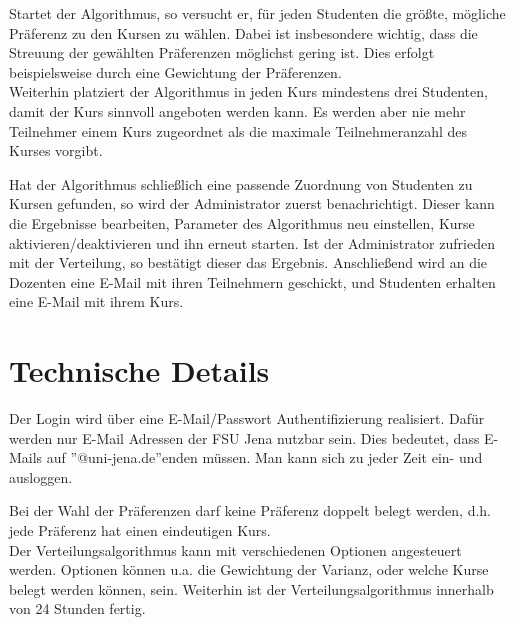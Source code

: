         Startet der Algorithmus, so versucht er, für jeden Studenten die größte, mögliche Präferenz zu den Kursen zu wählen.
        Dabei ist insbesondere wichtig, dass die Streuung der gewählten Präferenzen möglichst gering ist.
        Dies erfolgt beispielsweise durch eine Gewichtung der Präferenzen.\\
        Weiterhin platziert der Algorithmus in jeden Kurs mindestens drei Studenten, damit der Kurs sinnvoll angeboten werden kann.
        Es werden aber nie mehr Teilnehmer einem Kurs zugeordnet als die maximale Teilnehmeranzahl des Kurses vorgibt.
        
        Hat der Algorithmus schließlich eine passende Zuordnung von Studenten zu Kursen gefunden, so wird der Administrator zuerst benachrichtigt.
        Dieser kann die Ergebnisse bearbeiten, Parameter des Algorithmus neu einstellen, Kurse aktivieren/deaktivieren und ihn erneut starten.
        Ist der Administrator zufrieden mit der Verteilung, so bestätigt dieser das Ergebnis.
        Anschließend wird an die Dozenten eine E-Mail mit ihren Teilnehmern geschickt, und Studenten erhalten eine E-Mail mit ihrem Kurs.
    
    \section{Technische Details}
        Der Login wird über eine E-Mail/Passwort Authentifizierung realisiert.
        Dafür werden nur E-Mail Adressen der FSU Jena nutzbar sein. Dies bedeutet, dass E-Mails auf ''@uni-jena.de''enden müssen.
        Man kann sich zu jeder Zeit ein- und ausloggen.\newline
        
        Bei der Wahl der Präferenzen darf keine Präferenz doppelt belegt werden, d.h. jede Präferenz hat einen eindeutigen Kurs. \\ %
        
        Der Verteilungsalgorithmus kann mit verschiedenen Optionen angesteuert werden. Optionen können u.a. die Gewichtung der Varianz, oder welche Kurse belegt werden können, sein. Weiterhin ist der Verteilungsalgorithmus innerhalb von 24 Stunden fertig. \\
        
